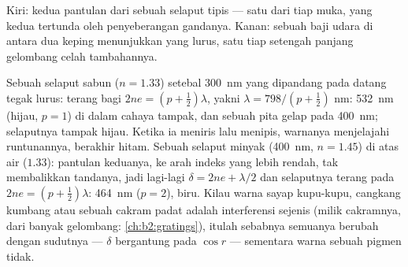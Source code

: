 \begin{omfigure}

{\small Kiri: kedua pantulan dari sebuah selaput tipis --- satu dari tiap
muka, yang kedua tertunda oleh penyeberangan gandanya. Kanan: sebuah baji udara
di antara dua keping menunjukkan  yang lurus, satu tiap
setengah panjang gelombang celah tambahannya.}
\end{omfigure}

\begin{example}\label{ex:b2:two-wave-interference:colours}
Sebuah selaput sabun ($n = 1.33$) setebal \qty{300}{nm} yang dipandang pada datang tegak lurus:
terang bagi $2ne = (p + \tfrac12)\lambda$, yakni $\lambda = 798/(p + \tfrac12)$ nm: \qty{532}{nm}
(hijau, $p = 1$) di dalam cahaya tampak, dan sebuah pita gelap pada \qty{400}{nm};
selaputnya tampak hijau. Ketika ia meniris lalu menipis, warnanya menjelajahi
runtunannya, berakhir hitam. Sebuah selaput minyak (\qty{400}{nm}, $n = 1.45$) di atas air
($1.33$): pantulan keduanya, ke arah indeks yang lebih rendah, tak membalikkan
tandanya, jadi lagi-lagi $\delta = 2ne + \lambda/2$ dan selaputnya terang pada $2ne =
(p + \tfrac12)\lambda$: \qty{464}{nm} ($p = 2$), biru. Kilau warna sayap
kupu-kupu, cangkang kumbang atau sebuah cakram padat adalah interferensi
sejenis (milik cakramnya, dari banyak gelombang: \cref{ch:b2:gratings}),
itulah sebabnya semuanya berubah dengan sudutnya --- $\delta$ bergantung pada $\cos r$ ---
sementara warna sebuah pigmen tidak.
\end{example}

